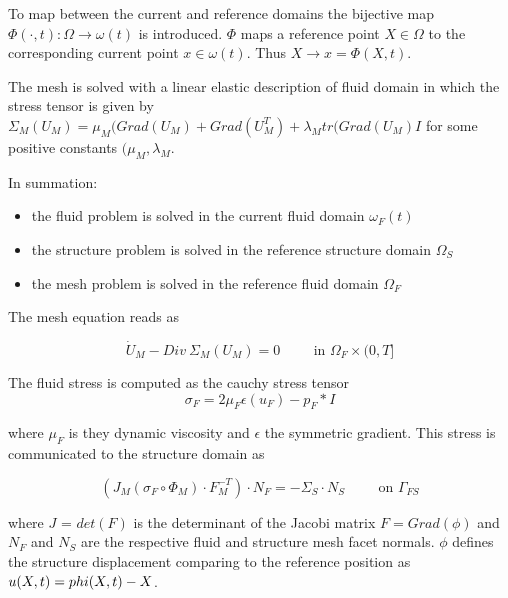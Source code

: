 \documentclass{article}
\begin{document}
To map between the current and reference domains the bijective map $\Phi (\cdot , t) : \Omega \rightarrow \omega(t)$ is introduced. $\Phi$ maps a reference point $X \in \Omega$ to the corresponding current point $x \in \omega(t)$. Thus $X \rightarrow x = \Phi (X,t)$. 




The mesh is solved with a linear elastic description of fluid domain in which the stress tensor is given by 
$\Sigma_M (U_M) = \mu_M (Grad (U_M) + Grad (U_M^T) + \lambda_M tr ( Grad(U_M) I$ for some positive constants $ (\mu_M, \lambda_M$. 

In summation: 

\begin{itemize}
\item the fluid problem is solved in the current fluid domain $\omega_F(t)$
\item the structure problem is solved in the reference structure domain $\Omega_S$
\item the mesh problem is solved in the reference fluid domain $\Omega_F$
\end{itemize}

The mesh equation reads as 

\begin{equation}
\dot{U}_M - Div \: \Sigma_M (U_M) = 0 \hspace{1cm} \text{in } \Omega_F \times (0, T]
\end{equation}

The fluid stress is computed as the cauchy stress tensor
\begin{equation}
\sigma_F = 2 \mu_F \epsilon( u_F) - p_F* I 
\end{equation}

where $\mu_F$ is they dynamic viscosity and $\epsilon$ the symmetric gradient. This stress is communicated to the structure domain as 

\begin{equation}
(J_M (\sigma_F \circ \Phi_M) \cdot F_M^{-T} ) \cdot N_F = -\Sigma_S \cdot N_S  \hspace{1cm} \text{on } \Gamma_{FS}
\end{equation}

where $J$ = $det(F)$ is the determinant of the Jacobi matrix $F = Grad (\phi)$ and $N_F$ and $N_S$ are the respective fluid and structure mesh facet normals. $\phi$ defines the structure displacement comparing to the reference position as $u(X,t) = \\phi(X,t) - X$. 
 
\end{document}
